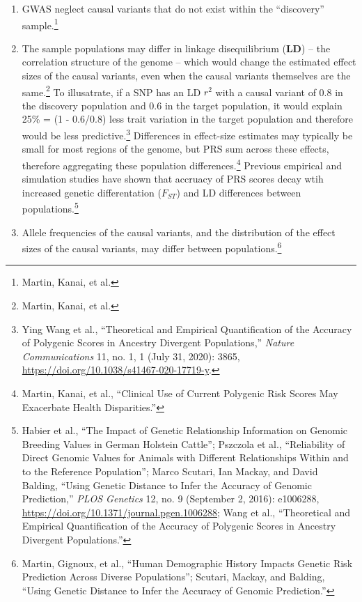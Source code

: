 \documentclass[
  9pt,
]{book}
\begin{document}
\begin{enumerate}
\def\labelenumi{\arabic{enumi}.}
\item
  GWAS neglect causal variants that do not exist within the ``discovery'' sample.\footnote{Martin, Kanai, et al.}
\item
  The sample populations may differ in linkage disequilibrium (\textbf{LD}) -- the correlation structure of the genome -- which would change the estimated effect sizes of the causal variants, even when the causal variants themselves are the same.\footnote{Martin, Kanai, et al.} To illusatrate, if a SNP has an LD \(r^2\) with a causal variant of 0.8 in the discovery population and 0.6 in the target population, it would explain 25\% = (1 - 0.6/0.8) less trait variation in the target population and therefore would be less predictive.\footnote{Ying Wang et al., {``Theoretical and Empirical Quantification of the Accuracy of Polygenic Scores in Ancestry Divergent Populations,''} \emph{Nature Communications} 11, no. 1, 1 (July 31, 2020): 3865, \url{https://doi.org/10.1038/s41467-020-17719-y}.} Differences in effect-size estimates may typically be small for most regions of the genome, but PRS sum across these effects, therefore aggregating these population differences.\footnote{Martin, Kanai, et al., {``Clinical Use of Current Polygenic Risk Scores May Exacerbate Health Disparities.''}} Previous empirical and simulation studies have shown that accruacy of PRS scores decay wtih increased genetic differentation (\(F_{ST}\)) and LD differences between populations.\footnote{Habier et al., {``The Impact of Genetic Relationship Information on Genomic Breeding Values in {German Holstein} Cattle''}; Pszczola et al., {``Reliability of Direct Genomic Values for Animals with Different Relationships Within and to the Reference Population''}; Marco Scutari, Ian Mackay, and David Balding, {``Using {Genetic Distance} to {Infer} the {Accuracy} of {Genomic Prediction},''} \emph{PLOS Genetics} 12, no. 9 (September 2, 2016): e1006288, \url{https://doi.org/10.1371/journal.pgen.1006288}; Wang et al., {``Theoretical and Empirical Quantification of the Accuracy of Polygenic Scores in Ancestry Divergent Populations.''}}
\item
  Allele frequencies of the causal variants, and the distribution of the effect sizes of the causal variants, may differ between populations.\footnote{Martin, Gignoux, et al., {``Human {Demographic History Impacts Genetic Risk Prediction} Across {Diverse Populations}''}; Scutari, Mackay, and Balding, {``Using {Genetic Distance} to {Infer} the {Accuracy} of {Genomic Prediction}.''}}

\end{enumerate}
\end{document}
